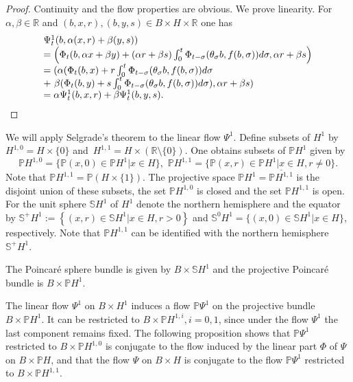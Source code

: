 	\begin{proof}
		Continuity and the flow properties are obvious. We prove linearity. For
		$\alpha,\beta\in\mathbb{R}$ and $(b,x,r),\allowbreak(b,y,s)\in B\times
		H\times\mathbb{R}$ one has
		\[%
		\begin{array}
			[c]{l}%
			\Psi_{t}^{1}(b,\alpha(x,r)+\beta(y,s))\\
			=\left(  \Phi_{t}(b,\alpha x+\beta y)+(\alpha r+\beta s)\int_{0}^{t}%
			\Phi_{t-\sigma}(\theta_{\sigma}b,f(b,\sigma))d\sigma,\alpha r+\beta s\right)
			\\
			=(\alpha(\Phi_{t}(b,x)+r\int_{0}^{t}\Phi_{t-\sigma}(\theta_{\sigma
			}b,f(b,\sigma))d\sigma\\
			+\,\,\beta(\Phi_{t}(b,y)+s\int_{0}^{t}\Phi_{t-\sigma}(\theta_{\sigma
			}b,f(b,\sigma))d\sigma),\alpha r+\beta s)\\
			=\alpha\Psi_{t}^{1}(b,x,r)+\beta\Psi_{t}^{1}(b,y,s).
		\end{array}
		\]
		
	\end{proof}
	
	We will apply Selgrade's theorem to the linear flow $\Psi^{1}$. Define subsets
	of $H^{1}$ by $H^{1,0}=H\times\{0\}$ and $\,H^{1,1}=H\times\left(
	\mathbb{R}\setminus\{0\}\right)  $. One obtains subsets of $\mathbb{P}H^{1}$
	given by
	\[
	\mathbb{P}H^{1,0}=\{\mathbb{P}(x,0)\in\mathbb{P}H^{1}\left\vert x\in H\right.
	\},\,\,\mathbb{P}H^{1,1}=\{\mathbb{P}(x,r)\in\mathbb{P}H^{1}\left\vert x\in
	H,r\not =0\right.  \}.
	\]
	Note that $\mathbb{P}H^{1,1}=\mathbb{P}\left(  H\times\{1\}\right)  $. The
	projective space $\mathbb{P}H^{1}=\overline{\mathbb{P}H^{1,1}}$ is the
	disjoint union of these subsets, the set $\mathbb{P}H^{1,0}$ is closed and the
	set $\mathbb{P}H^{1,1}$ is open. For the unit sphere $\mathbb{S}H^{1}$ of
	$H^{1}$ denote the northern hemisphere and the equator by $\mathbb{S}^{+}%
	H^{1}:=\left\{  (x,r)\in\mathbb{S}H^{1}\left\vert x\in H,r>0\right.  \right\}
	$ and $\mathbb{S}^{0}H^{1}=\{(x,0)\in\mathbb{S}H^{1}\left\vert x\in H\right.
	\}$, respectively. Note that $\mathbb{P}H^{1,1}$ can be identified with the
	northern hemisphere $\mathbb{S}^{+}H^{1}$.
	
	\begin{definition}
		The Poincar\'{e} sphere bundle is given by $B\times\mathbb{S}H^{1}$ and the
		projective Poincar\'{e} bundle is $B\times\mathbb{P}H^{1}$.
	\end{definition}
	
	The linear flow $\Psi^{1}$ on $B\times H^{1}$ induces a flow $\mathbb{P}
	\Psi^{1}$ on the projective bundle $B\times\mathbb{P}H^{1}$. It can be
	restricted to $B\times\mathbb{P}H^{1,i},i=0,1$, since under the flow $\Psi
	^{1}$ the last component remains fixed. The following proposition shows that
	$\mathbb{P}\Psi^{1}$ restricted to $B\times\mathbb{P}H^{1,0}$ is conjugate to
	the flow induced by the linear part $\Phi$ of $\Psi$ on $B\times\mathbb{P}H$,
	and that the flow $\Psi$ on $B\times H$ is conjugate to the flow
	$\mathbb{P}\Psi^{1}$ restricted to $B\times\mathbb{P}H^{1,1}$.
	

